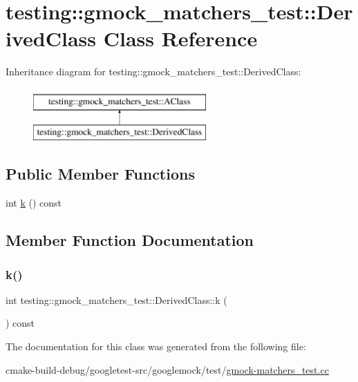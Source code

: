 \hypertarget{classtesting_1_1gmock__matchers__test_1_1DerivedClass}{}\section{testing\+::gmock\+\_\+matchers\+\_\+test\+::Derived\+Class Class Reference}
\label{classtesting_1_1gmock__matchers__test_1_1DerivedClass}
Inheritance diagram for testing\+::gmock\+\_\+matchers\+\_\+test\+::Derived\+Class\+:\begin{figure}[H]
\begin{center}
\leavevmode
\includegraphics[height=2.000000cm]{classtesting_1_1gmock__matchers__test_1_1DerivedClass}
\end{center}
\end{figure}
\subsection*{Public Member Functions}
\begin{DoxyCompactItemize}
\item 
int \mbox{\hyperlink{classtesting_1_1gmock__matchers__test_1_1DerivedClass_a6f8638915c84cb14365e337d99857847}{k}} () const
\end{DoxyCompactItemize}


\subsection{Member Function Documentation}
\mbox{\label{classtesting_1_1gmock__matchers__test_1_1DerivedClass_a6f8638915c84cb14365e337d99857847}} 
\subsubsection{\texorpdfstring{k()}{k()}}
{\footnotesize\ttfamily int testing\+::gmock\+\_\+matchers\+\_\+test\+::\+Derived\+Class\+::k (\begin{DoxyParamCaption}{ }\end{DoxyParamCaption}) const\hspace{0.3cm}{\ttfamily [inline]}}



The documentation for this class was generated from the following file\+:\begin{DoxyCompactItemize}
\item 
cmake-\/build-\/debug/googletest-\/src/googlemock/test/\mbox{\hyperlink{gmock-matchers__test_8cc}{gmock-\/matchers\+\_\+test.\+cc}}\end{DoxyCompactItemize}
